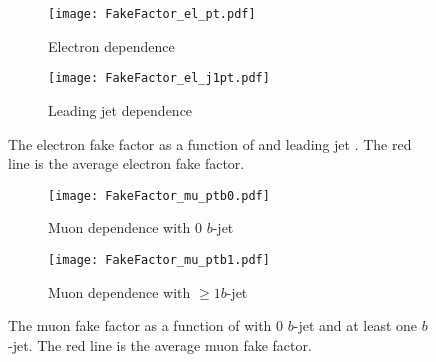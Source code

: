\begin{figure}[ht]
    \begin{center}
        \begin{subfigure}[b]{0.48\textwidth}
            \texttt{[image: FakeFactor\_el\_pt.pdf]}
            \caption{Electron \pt dependence}
            \label{fig:bkg_electron_fake_factor_pt}
        \end{subfigure}
        \begin{subfigure}[b]{0.48\textwidth}
            \texttt{[image: FakeFactor\_el\_j1pt.pdf]}
            \caption{Leading jet \pt dependence}
            \label{fig:bkg_electron_fake_factor_leading_jet_pt}
        \end{subfigure}
        \caption{The electron fake factor as a function of \pt and leading jet \pt.
        The red line is the average electron fake factor.}
        \label{fig:bkg_electron_fake_factor}
    \end{center}
\end{figure}

\begin{figure}[ht]
    \begin{center}
        \begin{subfigure}[b]{0.48\textwidth}
            \texttt{[image: FakeFactor\_mu\_ptb0.pdf]}
            \caption{Muon \pt dependence with 0 $b$-jet}
            \label{fig:bkg_muon_fake_factor_pt_0bjet}
        \end{subfigure}
        \begin{subfigure}[b]{0.48\textwidth}
            \texttt{[image: FakeFactor\_mu\_ptb1.pdf]}
            \caption{Muon \pt dependence with $\ge 1 b$-jet}
            \label{fig:bkg_muon_fake_factor_pt_bjets}
        \end{subfigure}
        \caption{The muon fake factor as a function of \pt with 0 $b$-jet and at least one $b$-jet.
        The red line is the average muon fake factor.}
        \label{fig:bkg_muon_fake_factor}
    \end{center}
\end{figure}


